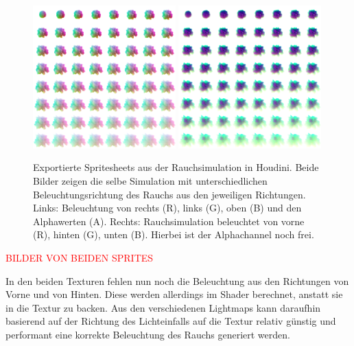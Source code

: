 \begin{figure}[h!]
	\centering
	\includegraphics[width=0.49\textwidth]{Grafiken/Implementation/Explo_T1_8x8.png}
	\includegraphics[width=0.49\textwidth]{Grafiken/Implementation/Explo_T2_8x8.png}
	\begin{footnotesize}
		\caption{Exportierte Spritesheets aus der Rauchsimulation in Houdini. Beide Bilder zeigen die selbe Simulation mit unterschiedlichen Beleuchtungsrichtung des Rauchs aus 
        den jeweiligen Richtungen. Links: Beleuchtung von rechts (R), links (G), oben (B) und den Alphawerten (A). 
        Rechts: Rauchsimulation beleuchtet von vorne (R), hinten (G), unten (B). Hierbei ist der Alphachannel noch frei.}
	\end{footnotesize}
	\label{fig:flipbook}
\end{figure}
\textcolor{red}{BILDER VON BEIDEN SPRITES}



In den beiden Texturen fehlen nun noch die Beleuchtung aus den Richtungen von Vorne und von Hinten. Diese werden allerdings im Shader
berechnet, anstatt sie in die Textur zu backen. Aus den verschiedenen Lightmaps kann daraufhin basierend auf der Richtung des Lichteinfalls
auf die Textur relativ günstig und performant eine korrekte Beleuchtung des Rauchs generiert werden.



